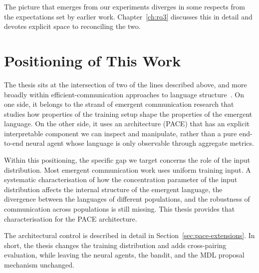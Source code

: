 The picture that emerges from our experiments diverges in some respects from the expectations set by earlier work. Chapter~\ref{ch:rq3} discusses this in detail and devotes explicit space to reconciling the two.

\section{Positioning of This Work}
\label{sec:bg-positioning}

The thesis sits at the intersection of two of the lines described above, and more broadly within efficient-communication approaches to language structure~\cite{kemp_kinship_2012,zaslavsky_efficient_2018,gibson_how_2019}. On one side, it belongs to the strand of emergent communication research that studies how properties of the training setup shape the properties of the emergent language. On the other side, it uses an architecture (PACE) that has an explicit interpretable component we can inspect and manipulate, rather than a pure end-to-end neural agent whose language is only observable through aggregate metrics.

Within this positioning, the specific gap we target concerns the role of the input distribution. Most emergent communication work uses uniform training input. A systematic characterisation of how the concentration parameter of the input distribution affects the internal structure of the emergent language, the divergence between the languages of different populations, and the robustness of communication across populations is still missing. This thesis provides that characterisation for the PACE architecture.

The architectural control is described in detail in Section~\ref{sec:pace-extensions}. In short, the thesis changes the training distribution and adds cross-pairing evaluation, while leaving the neural agents, the bandit, and the MDL proposal mechanism unchanged.